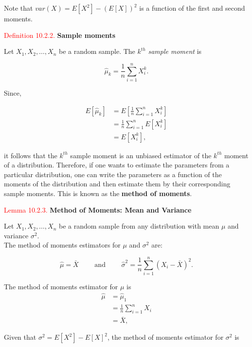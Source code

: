 \documentclass[
]{book}
\begin{document}
Note that \(var(X) = E[X^2] - (E[X])^2\) is a function of the first and second moments.

\leavevmode{}%
\textcolor{red}{Definition 10.2.2.}
{\textbf{Sample moments}}

Let \(X_1, X_2, \ldots, X_n\) be a random sample. The \(k^{th}\) \emph{sample moment} is

\[\hat{\mu}_k = \frac{1}{n} \sum_{i=1}^n X_i^k.\]

Since,

\begin{align*}
E[\hat{\mu}_k] &= E\left[ \frac{1}{n} \sum\limits_{i=1}^n X_i^k \right] \\
&= \frac{1}{n} \sum_{i=1}^n E\left[ X_i^k \right] \\ 
&= E\left[ X_i^k \right],
\end{align*}

it follows that the \(k^{th}\) sample moment is an unbiased estimator of the \(k^{th}\) moment of a distribution. Therefore, if one wants to estimate the parameters from a particular distribution, one can write the parameters as a function of the moments of the distribution and then estimate them by their corresponding sample moments. This is known as the \textbf{method of moments}.

\leavevmode{}%
\textcolor{red}{Lemma 10.2.3.}
{\textbf{Method of Moments: Mean and Variance}}

Let \(X_1,X_2,\dots,X_n\) be a random sample from any distribution with mean \(\mu\) and variance \(\sigma^2\).\\
The method of moments estimators for \(\mu\) and \(\sigma^2\) are:

\[ \hat{\mu} = \bar{X} \qquad \mbox{ and } \qquad \hat{\sigma}^2 = \frac{1}{n} \sum_{i=1}^n (X_i - \bar{X})^2. \]

\hypertarget{MLE:lemprf:moments}{}
The method of moments estimator for \(\mu\) is\\

\begin{align*}
\hat{\mu} &= \hat{\mu}_1 \\
&= \frac{1}{n} \sum\limits_{i=1}^n X_i \\
&= \bar{X}, \end{align*}

Given that \(\sigma^2 = E[X^2] - E[X]^2\), the method of moments estimator for \(\sigma^2\) is\\
\end{document}
